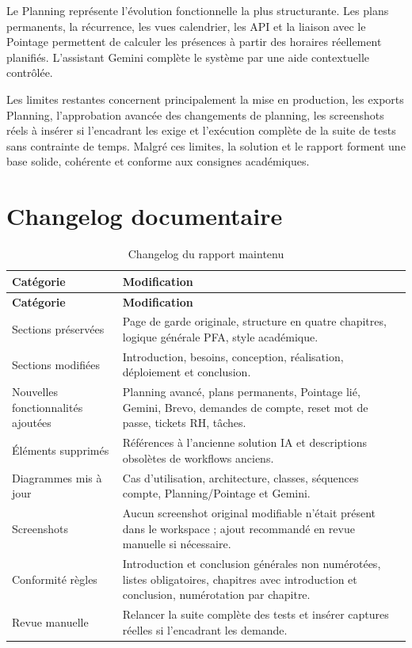 \documentclass[12pt,a4paper]{report}
\begin{document}
Le Planning représente l'évolution fonctionnelle la plus structurante. Les plans permanents, la récurrence, les vues calendrier, les API et la liaison avec le Pointage permettent de calculer les présences à partir des horaires réellement planifiés. L'assistant Gemini complète le système par une aide contextuelle contrôlée.

Les limites restantes concernent principalement la mise en production, les exports Planning, l'approbation avancée des changements de planning, les screenshots réels à insérer si l'encadrant les exige et l'exécution complète de la suite de tests sans contrainte de temps. Malgré ces limites, la solution et le rapport forment une base solide, cohérente et conforme aux consignes académiques.

\appendix
\chapter{Changelog documentaire}

\begin{longtable}{>{\raggedright\arraybackslash}p{4cm}>{\raggedright\arraybackslash}p{10cm}}
\caption{Changelog du rapport maintenu}\label{tab:changelog}\\
\toprule
\textbf{Catégorie} & \textbf{Modification} \\
\midrule
\endfirsthead
\toprule
\textbf{Catégorie} & \textbf{Modification} \\
\midrule
\endhead
Sections préservées & Page de garde originale, structure en quatre chapitres, logique générale PFA, style académique. \\
Sections modifiées & Introduction, besoins, conception, réalisation, déploiement et conclusion. \\
Nouvelles fonctionnalités ajoutées & Planning avancé, plans permanents, Pointage lié, Gemini, Brevo, demandes de compte, reset mot de passe, tickets RH, tâches. \\
Éléments supprimés & Références à l'ancienne solution IA et descriptions obsolètes de workflows anciens. \\
Diagrammes mis à jour & Cas d'utilisation, architecture, classes, séquences compte, Planning/Pointage et Gemini. \\
Screenshots & Aucun screenshot original modifiable n'était présent dans le workspace ; ajout recommandé en revue manuelle si nécessaire. \\
Conformité règles & Introduction et conclusion générales non numérotées, listes obligatoires, chapitres avec introduction et conclusion, numérotation par chapitre. \\
Revue manuelle & Relancer la suite complète des tests et insérer captures réelles si l'encadrant les demande. \\
\bottomrule
\end{longtable}
\end{document}
